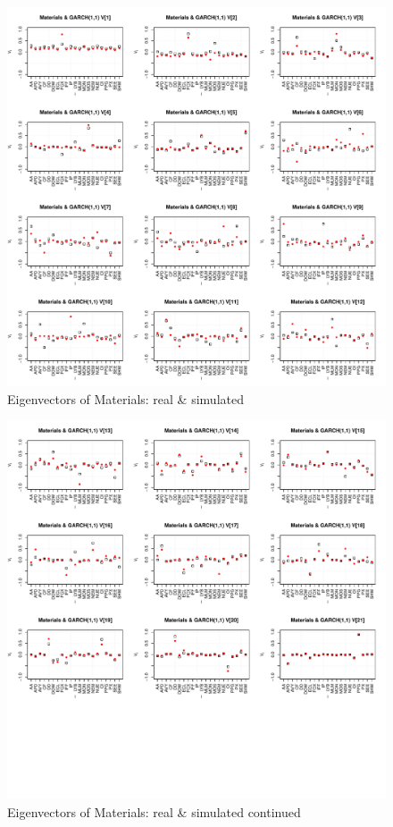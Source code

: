 \documentclass{article}
\begin{document}
\begin{figure}[htb!]
  \centering
  \includegraphics[scale=0.5]{Materials_eigenvectors1.pdf}
  \caption{Eigenvectors of Materials: real \& simulated}
  \label{fig:Materials_eigenvectors1}
\end{figure}

\begin{figure}[htb!]
  \centering
  \includegraphics[scale=0.5]{Materials_eigenvectors2.pdf}
  \caption{Eigenvectors of Materials: real \& simulated continued}
  \label{fig:Materials_eigenvectors2}
\end{figure}
\end{document}
